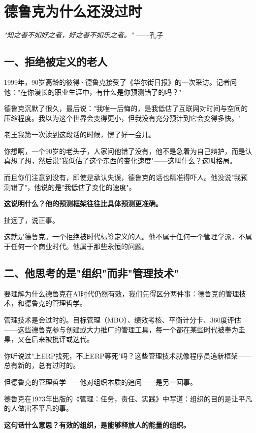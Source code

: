 \chapter{德鲁克为什么还没过时}


\textit{"知之者不如好之者，好之者不如乐之者。"}
——孔子


\section{一、拒绝被定义的老人}


1999年，90岁高龄的彼得·德鲁克接受了《华尔街日报》的一次采访。记者问他："在你漫长的职业生涯中，有什么是你预测错了的吗？"

德鲁克沉默了很久，最后说："我唯一后悔的，是我低估了互联网对时间与空间的压缩程度。我以为这个世界会变得更小，但我没有充分预计到它会变得多快。"

老王我第一次读到这段话的时候，愣了好一会儿。

你想啊，一个90岁的老头子，人家问他错了没有，他不是急着为自己辩护，而是认真想了想，然后说"我低估了这个东西的变化速度"——这叫什么？这叫格局。

而且你们注意到没有，即使是承认失误，德鲁克的话也精准得吓人。他没说"我预测错了"，他说的是"我低估了变化的速度"。

\textbf{这说明什么？他的预测框架往往比具体预测更准确。}

扯远了，说正事。

这就是德鲁克。一个拒绝被时代标签定义的人。他不属于任何一个管理学派，不属于任何一个商业时代。他属于那些永恒的问题。


\section{二、他思考的是"组织"而非"管理技术"}


要理解为什么德鲁克在AI时代仍然有效，我们先得区分两件事：德鲁克的管理技术，和德鲁克的管理哲学。

管理技术是会过时的。目标管理（MBO）、绩效考核、平衡计分卡、360度评估——这些德鲁克参与创建或大力推广的管理工具，每一个都在某些时代被奉为圭臬，又在后来被批评或迭代。

你听说过"上ERP找死，不上ERP等死"吗？这些管理技术就像程序员追新框架——总有新的，总有过时的。

但德鲁克的管理哲学——他对组织本质的追问——是另一回事。

德鲁克在1973年出版的《管理：任务，责任、实践》中写道：组织的目的是让平凡的人做出不平凡的事。

\textbf{这句话什么意思？有效的组织，是能够释放人的能量的组织。}

